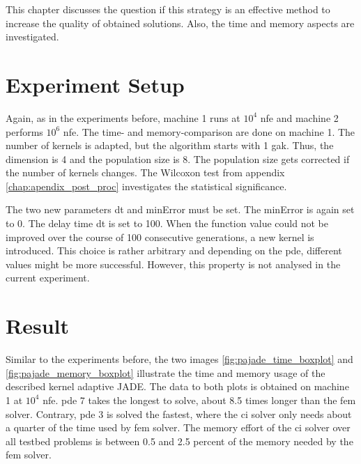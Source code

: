 \documentclass[./\jobname.tex]{subfiles}
\begin{document}
This chapter discusses the question if this strategy is an effective method to increase the quality of obtained solutions. Also, the time and memory aspects are investigated. 

\section{Experiment Setup}

Again, as in the experiments before, machine 1 runs at $10^4$ \gls{nfe} and machine 2 performs $10^6$ \gls{nfe}. The time- and memory-comparison are done on machine 1. The number of kernels is adapted, but the algorithm starts with 1 \gls{gak}. Thus, the dimension is 4 and the population size is 8. The population size gets corrected if the number of kernels changes. The Wilcoxon test from appendix \ref{chap:apendix_post_proc} investigates the statistical significance. 

The two new parameters \gls{dt} and minError must be set. The minError is again set to 0. The delay time \gls{dt} is set to 100. When the function value could not be improved over the course of 100 consecutive generations, a new kernel is introduced. This choice is rather arbitrary and depending on the \gls{pde}, different values might be more successful. However, this property is not analysed in the current experiment.

\section{Result}
\label{chap:results_ex2}

Similar to the experiments before, the two images \ref{fig:pajade_time_boxplot} and \ref{fig:pajade_memory_boxplot} illustrate the time and memory usage of the described kernel adaptive JADE. The data to both plots is obtained on machine 1 at $10^4$ \gls{nfe}. \gls{pde} 7 takes the longest to solve, about 8.5 times longer than the \gls{fem} solver. Contrary, \gls{pde} 3 is solved the fastest, where the \gls{ci} solver only needs about a quarter of the time used by \gls{fem} solver. The memory effort of the \gls{ci} solver over all testbed problems is between 0.5 and 2.5 percent of the memory needed by the \gls{fem} solver. 
\end{document}
